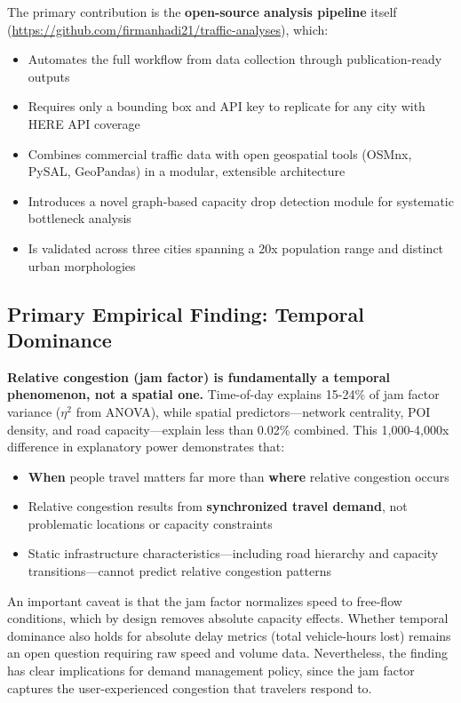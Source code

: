 \documentclass[12pt,a4paper]{article}
\begin{document}
The primary contribution is the \textbf{open-source analysis pipeline} itself (\url{https://github.com/firmanhadi21/traffic-analyses}), which:

\begin{itemize}
\item
  Automates the full workflow from data collection through publication-ready outputs
\item
  Requires only a bounding box and API key to replicate for any city with HERE API coverage
\item
  Combines commercial traffic data with open geospatial tools (OSMnx, PySAL, GeoPandas) in a modular, extensible architecture
\item
  Introduces a novel graph-based capacity drop detection module for systematic bottleneck analysis
\item
  Is validated across three cities spanning a 20x population range and distinct urban morphologies
\end{itemize}

\subsection{Primary Empirical Finding: Temporal Dominance}

\textbf{Relative congestion (jam factor) is fundamentally a temporal phenomenon, not a spatial one.} Time-of-day explains 15-24\% of jam factor variance ($\eta^2$ from ANOVA), while spatial predictors---network centrality, POI density, and road capacity---explain less than 0.02\% combined. This 1,000-4,000x difference in explanatory power demonstrates that:

\begin{itemize}

\item
  \textbf{When} people travel matters far more than \textbf{where} relative congestion occurs
\item
  Relative congestion results from \textbf{synchronized travel demand}, not problematic locations or capacity constraints
\item
  Static infrastructure characteristics---including road hierarchy and capacity transitions---cannot predict relative congestion patterns
\end{itemize}

An important caveat is that the jam factor normalizes speed to free-flow conditions, which by design removes absolute capacity effects. Whether temporal dominance also holds for absolute delay metrics (total vehicle-hours lost) remains an open question requiring raw speed and volume data. Nevertheless, the finding has clear implications for demand management policy, since the jam factor captures the user-experienced congestion that travelers respond to.
\end{document}
